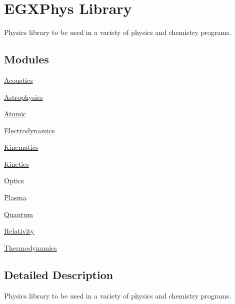 \hypertarget{group___e_g_x_phys}{}\section{E\+G\+X\+Phys Library}
\label{group___e_g_x_phys}


Physics library to be used in a variety of physics and chemistry programs.  


\subsection*{Modules}
\begin{DoxyCompactItemize}
\item 
\mbox{\hyperlink{group___e_g_x_phys-_acoustics}{Acoustics}}
\item 
\mbox{\hyperlink{group___e_g_x_phys-_astrophysics}{Astrophysics}}
\item 
\mbox{\hyperlink{group___e_g_x_phys-_atomic}{Atomic}}
\item 
\mbox{\hyperlink{group___e_g_x_phys-_electrodynamics}{Electrodynamics}}
\item 
\mbox{\hyperlink{group___kinematics}{Kinematics}}
\item 
\mbox{\hyperlink{group___e_g_x_phys-_kinetics}{Kinetics}}
\item 
\mbox{\hyperlink{group___e_g_x_phys-_optics}{Optics}}
\item 
\mbox{\hyperlink{group___e_g_x_phys-_plasma}{Plasma}}
\item 
\mbox{\hyperlink{group___e_g_x_phys-_quantum}{Quantum}}
\item 
\mbox{\hyperlink{group___e_g_x_phys-_relativity}{Relativity}}
\item 
\mbox{\hyperlink{group___e_g_x_phys-_thermodynamics}{Thermodynamics}}
\end{DoxyCompactItemize}


\subsection{Detailed Description}
Physics library to be used in a variety of physics and chemistry programs. 

